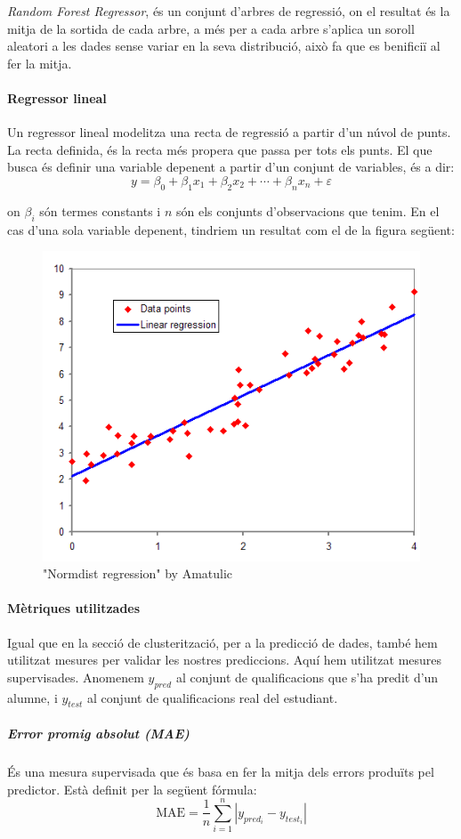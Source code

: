 \documentclass[12pt,a4paper,catalan]{article}
\begin{document}
\textit{Random Forest Regressor}, és un conjunt d'arbres de regressió, on el resultat és la mitja de la sortida de cada arbre, a més per a cada arbre s'aplica un soroll aleatori a les dades sense variar en la seva distribució, això fa que es benificiï al fer la mitja. 

\newpage

\paragraph{Regressor lineal}
Un regressor lineal modelitza una recta de regressió a partir d'un núvol de punts. La recta definida, és la recta més propera que passa per tots els punts. El que busca és definir una variable depenent a partir d'un conjunt de variables, és a dir:
$$
y =\beta_0+\beta_1 x_1+\beta_2 x_2+ \cdots + \beta_n x_n + \varepsilon
$$

on $\beta_i$ són termes constants i $n$ són els conjunts d'observacions que tenim. En el cas d'una sola variable depenent, tindriem un resultat com el de la figura següent:

\begin{figure}[h]
\centering
\includegraphics[width=.5\linewidth]{img/linearregression.png}
\caption{"Normdist regression" by Amatulic}
\end{figure}

\paragraph{Mètriques utilitzades}
Igual que en la secció de clusterització, per a la predicció de dades, també hem utilitzat mesures per validar les nostres prediccions. Aquí hem utilitzat mesures supervisades. Anomenem $y_{pred}$ al conjunt de qualificacions que s'ha predit d'un alumne, i $y_{test}$ al conjunt de qualificacions real del estudiant.

\subparagraph{Error promig absolut (MAE)}
És una mesura supervisada que és basa en fer la mitja dels errors produïts pel predictor. Està definit per la següent fórmula:
$$ \mathrm{MAE} = \frac{1}{n}\sum_{i=1}^n \left| y_{pred_i}-y_{test_i}\right| $$
\end{document}
